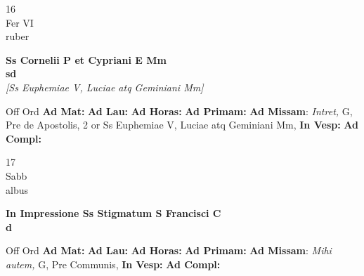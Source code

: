 \documentclass[10pt, openany]{book}
\begin{document}
        \begin{center}
            \begin{minipage}{3.5in}
                \vspace{2em}
                \begin{minipage}{0.5in}
                    {\Huge 16} \\
                    {\normalsize Fer VI} \\
                    {\normalsize ruber}
                \end{minipage}
                \begin{minipage}{3.0in}
                    \textbf{ \large Ss Cornelii P et Cypriani E Mm \\
                    \textnormal{\normalsize sd}} \\ \textit{[Ss Euphemiae V, Luciae atq Geminiani Mm]} \\ 
                \end{minipage}
                \begin{justify}Off Ord
                    \textbf{Ad Mat: }
                    \textbf{Ad Lau: }
                    \textbf{Ad Horas: }
                    \textbf{Ad Primam: }\textbf{Ad Missam}: \textit{Intret,} G, Pre de Apostolis, 2 or Ss Euphemiae V, Luciae atq Geminiani Mm,  
                    \textbf{In Vesp: }
                    \textbf{Ad Compl: }
                \end{justify}
            \end{minipage}
        \end{center}
    
        \begin{center}
            \begin{minipage}{3.5in}
                \vspace{2em}
                \begin{minipage}{0.5in}
                    {\Huge 17} \\
                    {\normalsize Sabb} \\
                    {\normalsize albus}
                \end{minipage}
                \begin{minipage}{3.0in}
                    \textbf{ \large In Impressione Ss Stigmatum S Francisci C \\
                    \textnormal{\normalsize d}} \\ 
                \end{minipage}
                \begin{justify}Off Ord
                    \textbf{Ad Mat: }
                    \textbf{Ad Lau: }
                    \textbf{Ad Horas: }
                    \textbf{Ad Primam: }\textbf{Ad Missam}: \textit{Mihi autem,} G, Pre Communis,  
                    \textbf{In Vesp: }
                    \textbf{Ad Compl: }
                \end{justify}
            \end{minipage}
        \end{center}
    
\end{document}
